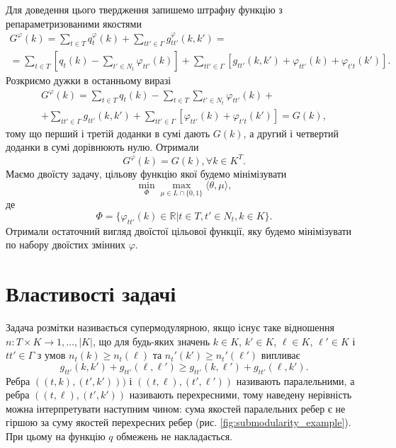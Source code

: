Для доведення цього твердження запишемо штрафну функцію з репараметризованими
якостями
\begin{gather*}
  G^{\varphi}(k) =  \sum\limits_{t\in T} q^{\varphi}_t(k)+
  \sum\limits_{tt'\in \Gamma} g^{\varphi}_{tt'}(k,k')=\\
  =\sum\limits_{t\in T}  \left[ q_t(k)- \sum\limits_{t'\in N_t} \varphi_{tt'}(k) \right]
  +\sum\limits_{tt'\in \Gamma} \left[g_{tt'}(k,k') + \varphi_{tt'}(k) + \varphi_{t't}(k') \right].
\end{gather*}
Розкриємо дужки в останньому виразі
\begin{gather*}
  G^{\varphi}(k) =  \sum\limits_{t\in T} q_t(k)-\sum\limits_{t\in T}\sum\limits_{t'\in N_t}\varphi_{tt'}(k)+\\
  +\sum\limits_{tt'\in \Gamma}g_{tt'}(k,k')+\sum\limits_{tt'\in \Gamma}\left[ \varphi_{tt'}(k) + \varphi_{t't}(k')\right]=G(k),
\end{gather*}
тому що перший і третій доданки в сумі дають $G(k)$, а другий і четвертий доданки в сумі дорівнюють нулю.
Отримали
\begin{equation*}
  G^{\varphi}(k) = G(k), \forall k\in K^T.
\end{equation*}
Маємо двоїсту задачу, цільову функцію якої будемо мінімізувати
\begin{equation}
  \min_{\Phi}\max_{\mu\in L\cap \{0,1\}}\langle\theta,\mu\rangle,
\end{equation}
де
\begin{equation}
  \Phi = \{\varphi_{tt'}(k)\in\mathbb{R}|t\in T, t'\in N_t, k\in K\}.
\end{equation}
Отримали остаточний вигляд двоїстої цільової функції, яку будемо мінімізувати
по набору двоїстих змінних $\varphi$.

\section{Властивості задачі}

Задача розмітки називається супермодулярною, якщо існує таке відношення
$n:T\times K\rightarrow {1,\dots, \left\lvert K\right\rvert } $,
що для будь-яких значень $k\in K$, $k'\in K$, $\ell \in K$, $\ell'\in K$ і $tt'\in \Gamma$ з умов
$n_t(k)\geq n_t(\ell)$ та $n_t'(k')\geq n_t'(\ell')$ випливає
\begin{equation*}
    g_{tt'}(k,k') + g_{tt'}(\ell,\ell')\geq g_{tt'}(k,\ell') + g_{tt'}(\ell,k').
   \end{equation*}
Ребра $((t,k),(t',k')))$ і $((t,\ell),(t',\ell'))$ називають паралельними,
а ребра $((t,\ell),(t',k'))$ називають перехресними, тому наведену нерівність
можна інтерпретувати наступним чином: сума якостей паралельних ребер є не гіршою
за суму якостей перехресних ребер (рис. \ref{fig:submodularity_example}). При цьому на функцію $q$ обмежень не накладається.

